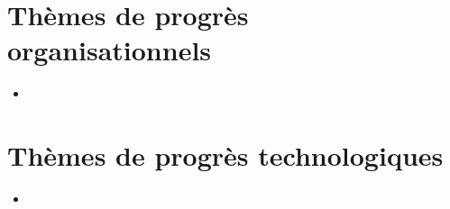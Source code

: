 \section{Thèmes de progrès organisationnels}
        \begin{itemize}
                \item 
        \end{itemize}

\section{Thèmes de progrès technologiques}
        \begin{itemize}
                \item 
        \end{itemize}


